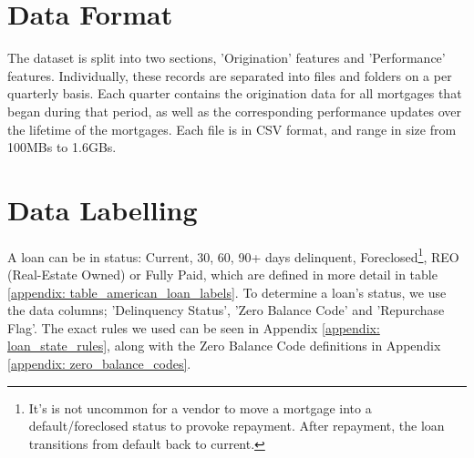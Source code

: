         
        
    
    \section{Data Format} \label{data_format}
        The dataset is split into two sections, 'Origination' features and 'Performance' features. Individually, these records are separated into files and folders on a per quarterly basis. Each quarter contains the origination data for all mortgages that began during that period, as well as the corresponding performance updates over the lifetime of the mortgages. Each file is in CSV format, and range in size from 100MBs to 1.6GBs. 
    
    \section{Data Labelling} \label{data_labelling}
        

        
        A loan can be in status: Current, 30, 60, 90+ days delinquent, Foreclosed\footnote{It's is not uncommon for a vendor to move a mortgage into a default/foreclosed status to provoke repayment. After repayment, the loan transitions from default back to current.}, REO (Real-Estate Owned) or Fully Paid, which are defined in more detail in table \ref{appendix: table_american_loan_labels}. To determine a loan's status, we use the data columns; 'Delinquency Status', 'Zero Balance Code' and 'Repurchase Flag'. The exact rules we used can be seen in Appendix \ref{appendix: loan_state_rules}, along with the Zero Balance Code definitions in Appendix \ref{appendix: zero_balance_codes}.
        
